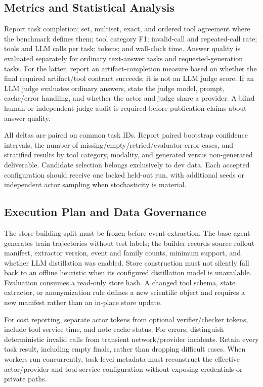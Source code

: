\documentclass[10pt]{article}
\begin{document}
\subsection{Metrics and Statistical Analysis}
Report task completion; set, multiset, exact, and ordered tool agreement where the benchmark defines them; tool category F1; invalid-call and repeated-call rate; tools and LLM calls per task; tokens; and wall-clock time. Answer quality is evaluated separately for ordinary text-answer tasks and requested-generation tasks. For the latter, report an artifact-completion measure based on whether the final required artifact/tool contract succeeds; it is not an LLM judge score. If an LLM judge evaluates ordinary answers, state the judge model, prompt, cache/error handling, and whether the actor and judge share a provider. A blind human or independent-judge audit is required before publication claims about answer quality.

All deltas are paired on common task IDs. Report paired bootstrap confidence intervals, the number of missing/empty/retried/evaluator-error cases, and stratified results by tool category, modality, and generated versus non-generated deliverable. Candidate selection belongs exclusively to dev data. Each accepted configuration should receive one locked held-out run, with additional seeds or independent actor sampling when stochasticity is material.

\subsection{Execution Plan and Data Governance}
The store-building split must be frozen before event extraction. The base agent generates train trajectories without test labels; the builder records source rollout manifest, extractor version, event and family counts, minimum support, and whether LLM distillation was enabled. Store construction must not silently fall back to an offline heuristic when its configured distillation model is unavailable. Evaluation consumes a read-only store hash. A changed tool schema, state extractor, or anonymization rule defines a new scientific object and requires a new manifest rather than an in-place store update.

For cost reporting, separate actor tokens from optional verifier/checker tokens, include tool service time, and note cache status. For errors, distinguish deterministic invalid calls from transient network/provider incidents. Retain every task result, including empty finals, rather than dropping difficult cases. When workers run concurrently, task-level metadata must reconstruct the effective actor/provider and tool-service configuration without exposing credentials or private paths.
\end{document}
